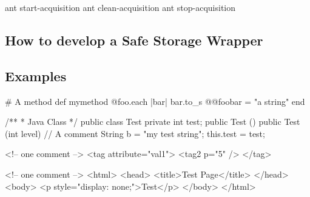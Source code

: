 \begin{bashcode}
ant start-acquisition
ant clean-acquisition
ant stop-acquisition
\end{bashcode}

\subsection{How to develop a Safe Storage Wrapper}




































\newpage
\subsection{Examples}
\begin{rubycode}[caption={Ruby Code Example}, label=listing:ruby:example]
# A method
def mymethod 
	@foo.each { |bar| bar.to_s }
	@@foobar = "a string"
end
\end{rubycode}

\begin{javacode}
/**
 * Java Class
 */
public class Test {
	private int test;
	public Test () {}
	public Test (int level) {
		// A comment
		String b = "my test string";
		this.test = test;
	}
}
\end{javacode}

\begin{xmlcode}[caption={XML Code Example}, label=listing:xml:example]
<!-- one comment -->
<tag attribute="val1">
	<tag2 p="5" />
</tag>
\end{xmlcode}

\begin{htmlcode}
<!-- one comment -->
<html>
	<head>
		<title>Test Page</title>
	</head>
	<body>
		<p style="display: none;">Test</p>
	</body>
</html>
\end{htmlcode}

\cite{dummyarticle}

